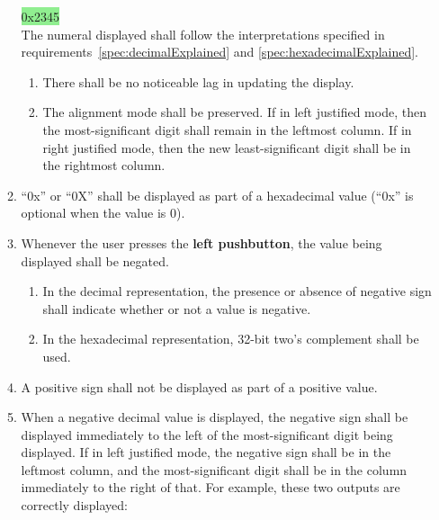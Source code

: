 \begin{enumerate}
\begin{enumerate}
{                \colorbox{LightGreen}{\phantom{xxxxxxxxxx}0x2345}
            } \\
            The numeral displayed shall follow the interpretations specified in requirements~\ref{spec:decimalExplained} and \ref{spec:hexadecimalExplained}.
            \begin{enumerate}
                \item There shall be no noticeable lag in updating the display.
                \item The alignment mode shall be preserved.
                    If in left justified mode, then the most-significant digit shall remain in the leftmost column.
                    If in right justified mode, then the new least-significant digit shall be in the rightmost column.
            \end{enumerate}
        \item ``0x'' or ``0X'' shall be displayed as part of a hexadecimal value (``0x'' is optional when the value is 0).
        \item Whenever the user presses the \textbf{left pushbutton}, the value being displayed shall be negated.
            \begin{enumerate}
                \item In the decimal representation, the presence or absence of negative sign shall indicate whether or not a value is negative.
                \item In the hexadecimal representation, 32-bit two's complement shall be used.
            \end{enumerate}
        \item A positive sign shall not be displayed as part of a positive value.
        \item When a negative decimal value is displayed, the negative sign shall be displayed immediately to the left of the most-significant digit being displayed.
            If in left justified mode, the negative sign shall be in the leftmost column, and the most-significant digit shall be in the column immediately to the right of that.
            For example, these two outputs are correctly displayed: \\

\end{enumerate}
\end{enumerate}
